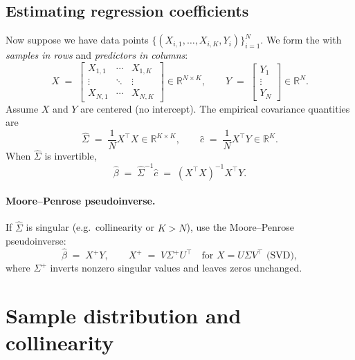 \subsection{Estimating regression coefficients}
Now suppose we have data points $\{(X_{i,1},\dots,X_{i,K},Y_i)\}_{i=1}^N$. 
We form the  with \emph{samples in rows} and \emph{predictors in columns}:
\begin{equation}
X \;=\;
\begin{bmatrix}
X_{1,1} & \cdots & X_{1,K}\\
\vdots  & \ddots & \vdots \\
X_{N,1} & \cdots & X_{N,K}
\end{bmatrix}
\in\mathbb{R}^{N\times K},
\qquad
Y \;=\; \begin{bmatrix} Y_1 \\ \vdots \\ Y_N \end{bmatrix}\in\mathbb{R}^{N}.
\label{eq:design-nk}
\end{equation}
Assume $X$ and $Y$ are centered (no intercept). The empirical covariance quantities are
\begin{equation}
\hat{\Sigma} \;=\; \frac{1}{N}X^\top X \in \mathbb{R}^{K\times K},
\qquad
\hat{c} \;=\; \frac{1}{N}X^\top Y \in \mathbb{R}^{K}.
\label{eq:emp-cov}
\end{equation}
When $\hat{\Sigma}$ is invertible,
\begin{equation}
\hat{\beta} \;=\; \hat{\Sigma}^{-1}\hat{c}
\;=\; (X^\top X)^{-1}X^\top Y.
\label{eq:beta-inv}
\end{equation}

\paragraph{Moore--Penrose pseudoinverse.}
If $\hat{\Sigma}$ is singular (e.g.\ collinearity or $K>N$), use the Moore--Penrose pseudoinverse:
\begin{equation}
\hat{\beta} \;=\; X^{+}Y,
\qquad
X^{+} \;=\; V\Sigma^{+}U^\top\quad\text{for }X=U\Sigma V^\top\text{ (SVD)},
\label{eq:beta-pinv-nk}
\end{equation}
where $\Sigma^{+}$ inverts nonzero singular values and leaves zeros unchanged.


\section{Sample distribution and collinearity}

